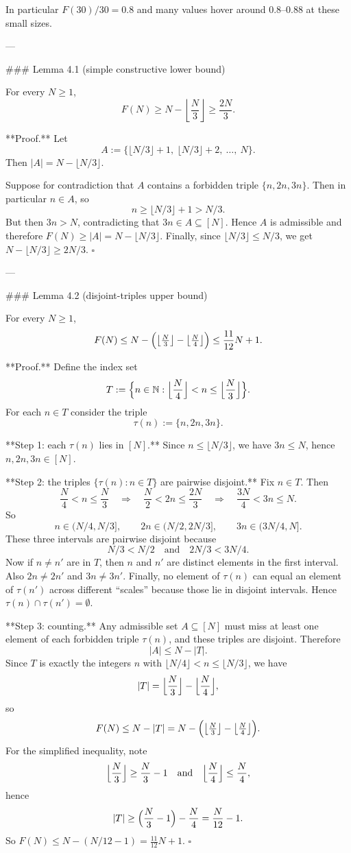In particular $F(30)/30=0.8$ and many values hover around $0.8$–$0.88$ at these small sizes.

---

### Lemma 4.1 (simple constructive lower bound)

For every $N\ge 1$,
\[
F(N)\ge N-\left\lfloor \frac N3\right\rfloor\ge \frac{2N}{3}.
\]

**Proof.**
Let
\[
A:=\{\lfloor N/3\rfloor+1,\ \lfloor N/3\rfloor+2,\ \dots,\ N\}.
\]
Then $|A|=N-\lfloor N/3\rfloor$.

Suppose for contradiction that $A$ contains a forbidden triple $\{n,2n,3n\}$.
Then in particular $n\in A$, so
\[
 n\ge \lfloor N/3\rfloor+1 > N/3.
\]
But then $3n>N$, contradicting that $3n\in A\subseteq [N]$.
Hence $A$ is admissible and therefore $F(N)\ge |A|=N-\lfloor N/3\rfloor$.
Finally, since $\lfloor N/3\rfloor\le N/3$, we get $N-\lfloor N/3\rfloor\ge 2N/3$.
$\square$

---

### Lemma 4.2 (disjoint-triples upper bound)

For every $N\ge 1$,
\[
F(N)\le N-\Bigl(\bigl\lfloor \tfrac N3\bigr\rfloor-\bigl\lfloor \tfrac N4\bigr\rfloor\Bigr)
\le \frac{11}{12}N+1.
\]

**Proof.**
Define the index set
\[
T:=\Bigl\{n\in\mathbb N: \Bigl\lfloor \frac N4\Bigr\rfloor < n \le \Bigl\lfloor \frac N3\Bigr\rfloor\Bigr\}.
\]
For each $n\in T$ consider the triple
\[
\tau(n):=\{n,2n,3n\}.
\]

**Step 1: each $\tau(n)$ lies in $[N]$.**
Since $n\le \lfloor N/3\rfloor$, we have $3n\le N$, hence $n,2n,3n\in [N]$.

**Step 2: the triples $\{\tau(n):n\in T\}$ are pairwise disjoint.**
Fix $n\in T$. Then
\[
\frac N4 < n \le \frac N3
\quad\Longrightarrow\quad
\frac N2 < 2n \le \frac{2N}{3}
\quad\Longrightarrow\quad
\frac{3N}{4} < 3n \le N.
\]
So
\[
 n\in (N/4,N/3],\qquad 2n\in (N/2,2N/3],\qquad 3n\in (3N/4,N].
\]
These three intervals are pairwise disjoint because
\[
N/3 < N/2 \quad\text{and}\quad 2N/3 < 3N/4.
\]
Now if $n\ne n'$ are in $T$, then $n$ and $n'$ are distinct elements in the first interval. Also $2n\ne 2n'$ and $3n\ne 3n'$. Finally, no element of $\tau(n)$ can equal an element of $\tau(n')$ across different “scales” because those lie in disjoint intervals. Hence $\tau(n)\cap \tau(n')=\emptyset$.

**Step 3: counting.**
Any admissible set $A\subseteq [N]$ must miss at least one element of each forbidden triple $\tau(n)$, and these triples are disjoint. Therefore
\[
|A|\le N-|T|.
\]
Since $T$ is exactly the integers $n$ with $\lfloor N/4\rfloor<n\le \lfloor N/3\rfloor$, we have
\[
|T|=\Bigl\lfloor \frac N3\Bigr\rfloor-\Bigl\lfloor \frac N4\Bigr\rfloor,
\]
so
\[
F(N)\le N-|T|=N-\Bigl(\bigl\lfloor \tfrac N3\bigr\rfloor-\bigl\lfloor \tfrac N4\bigr\rfloor\Bigr).
\]
For the simplified inequality, note
\[
\Bigl\lfloor \frac N3\Bigr\rfloor\ge \frac N3-1
\quad\text{and}\quad
\Bigl\lfloor \frac N4\Bigr\rfloor\le \frac N4,
\]
hence
\[
|T|\ge \Bigl(\frac N3-1\Bigr)-\frac N4=\frac N{12}-1.
\]
So $F(N)\le N-(N/12-1)=\frac{11}{12}N+1$.
$\square$

